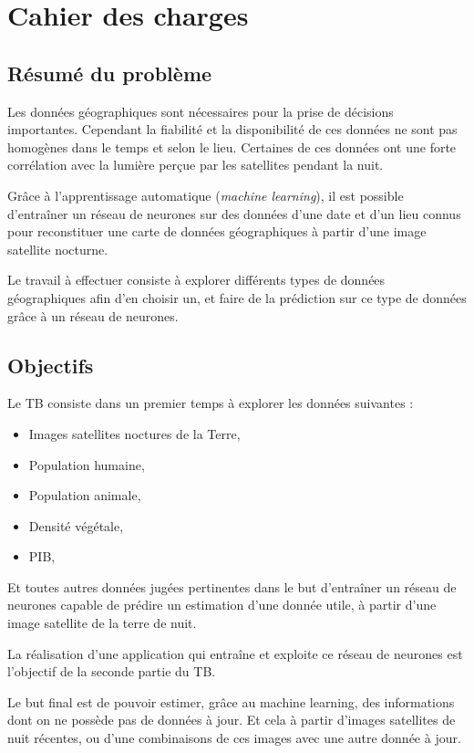 \documentclass[a4paper]{report}
\begin{document}
\chapter{Cahier des charges}

\section{Résumé du problème}
Les données géographiques sont nécessaires pour la prise de décisions importantes. Cependant la fiabilité et la disponibilité de ces données ne sont pas homogènes dans le temps et selon le lieu. Certaines de ces données ont une forte corrélation avec la lumière perçue par les satellites pendant la nuit.

Grâce à l'apprentissage automatique (\textit{machine learning}), il est possible d'entraîner un réseau de neurones sur des données d'une date et d'un lieu connus pour reconstituer une carte de données géographiques à partir d'une image satellite nocturne.

Le travail à effectuer consiste à explorer différents types de données géographiques afin d'en choisir un, et faire de la prédiction sur ce type de données grâce à un réseau de neurones.

\section{Objectifs}
Le TB consiste dans un premier temps à explorer les données suivantes :

\begin{itemize}
\item Images satellites noctures de la Terre,
\item Population humaine,
\item Population animale,
\item Densité végétale,
\item PIB,
\end{itemize}

Et toutes autres données jugées pertinentes dans le but d'entraîner un réseau de neurones capable de prédire un estimation d'une donnée utile, à partir d'une image satellite de la terre de nuit.

La réalisation d'une application qui entraîne et exploite ce réseau de neurones est l'objectif de la seconde partie du TB.

Le but final est de pouvoir estimer, grâce au machine learning, des informations dont on ne possède pas de données à jour. Et cela à partir d'images satellites de nuit récentes, ou d'une combinaisons de ces images avec une autre donnée à jour.
\end{document}
